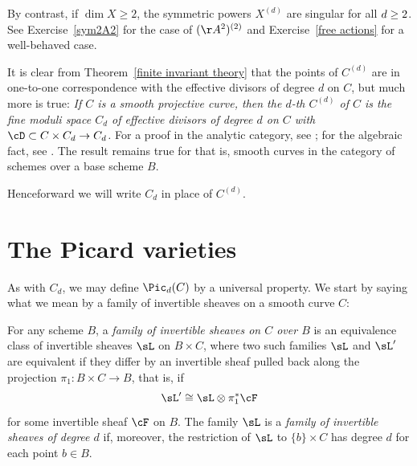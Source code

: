 By contrast, if $\dim X \geq 2$, the symmetric powers $X^{(d)}$ are
singular for all $d \geq \nobreak 2$.
See Exercise~\ref{sym2A2} for the case of $(\AA^2)^{(2)}$ and Exercise~\ref{free actions} for a well-behaved case.
\vspace{3pt}

\begin{fact}
It is clear from Theorem~\ref{finite invariant theory} that the points
of $C^{(d)}$ are in one-to-one correspondence with the effective
divisors of degree $d$ on $C$, but much more is true: 
\smallbreak
{\it
If $C$ is a smooth projective curve, then the $d$-th 
%
$C^{(d)}$ of $C$ is the 
fine moduli space 
%
$C_d$ of effective divisors of degree $d$ on $C$ with 
%
%
$\cD\subset C\times C_d \to C_d$.
}
\smallbreak
For a proof in the analytic category, see \cite[p.\,164]{ACGH}; 
for the algebraic fact, see \cite[Remark 9.3.9]{Kleiman-PicardScheme}. 
The result remains true for 
%
 that is, smooth curves in
the category of schemes over a base scheme $B$.
\end{fact}

Henceforward we will write $C_d$ in place of $C^{(d)}$.



\section{The Picard varieties}\label{Picard section}

As with $C_d$, we may define $\Pic_d(C)$ by a universal property. We start by saying what we mean by a family of invertible sheaves on a smooth curve $C$:

\begin{definition}
For any scheme $B$, a \emph{family of invertible sheaves on $C$ over $B$} 
%
is an equivalence class of invertible sheaves $\sL$ on $B\times C$, 
where two such
 families $\sL$ and $\sL'$ are equivalent if they differ by an invertible sheaf pulled back along the projection $\pi_1: B\times C \to B$, that is, if
 $$
 \sL' \cong \sL \otimes \pi_1^*\cF
 $$
for some invertible sheaf $\cF$ on $B$.
The family $\sL$  is a \emph{family of invertible sheaves of degree $d$} if, moreover, the restriction of $\sL$
 to $\{b\}\times C$ has degree $d$ for each point $b\in B$. 
 \end{definition}

